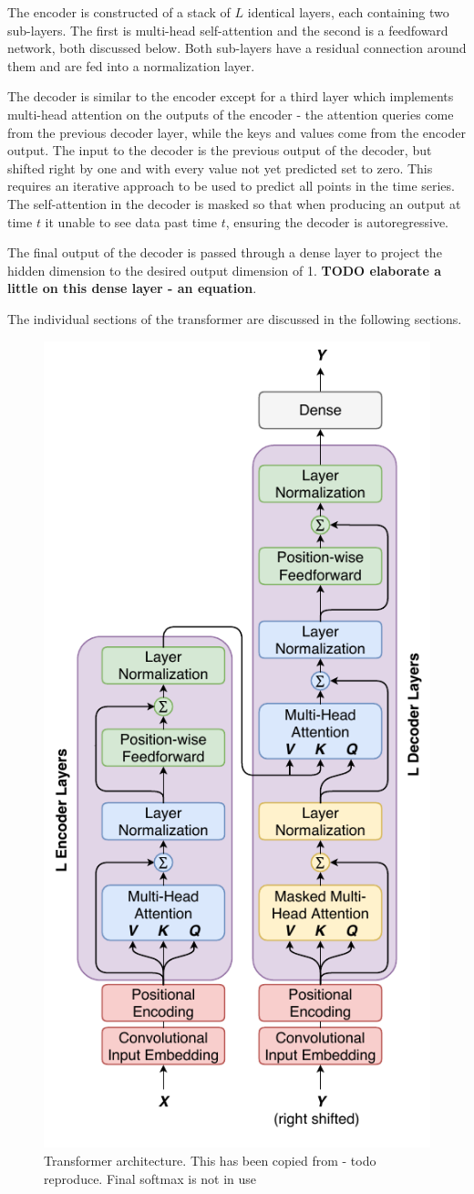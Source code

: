 \documentclass[conference]{IEEEtran}
\begin{document}
The encoder is constructed of a stack of $L$ identical layers, each containing two sub-layers.
The first is multi-head self-attention and the second is a feedfoward network, both discussed below.
Both sub-layers have a residual connection around them and are fed into a normalization layer.

The decoder is similar to the encoder except for a third layer which implements multi-head attention on the outputs of the encoder - the attention queries come from the previous decoder layer, while the keys and values come from the encoder output.
The input to the decoder is the previous output of the decoder, but shifted right by one and with every value not yet predicted set to zero.
This requires an iterative approach to be used to predict all points in the time series.
The self-attention in the decoder is masked so that when producing an output at time $t$ it unable to see data past time $t$, ensuring the decoder is autoregressive.

The final output of the decoder is passed through a dense layer to project the hidden dimension to the desired output dimension of 1.
\textbf{TODO elaborate a little on this dense layer - an equation}.

The individual sections of the transformer are discussed in the following sections.

\begin{figure}[htbp]
	\centerline{\includegraphics[width=.35\textwidth]{images/transformer.pdf}}
	\caption{Transformer architecture. This has been copied from \cite{Vaswani2017} - todo reproduce. Final softmax is not in use}
	\label{fig:transformer}
\end{figure}
\end{document}
